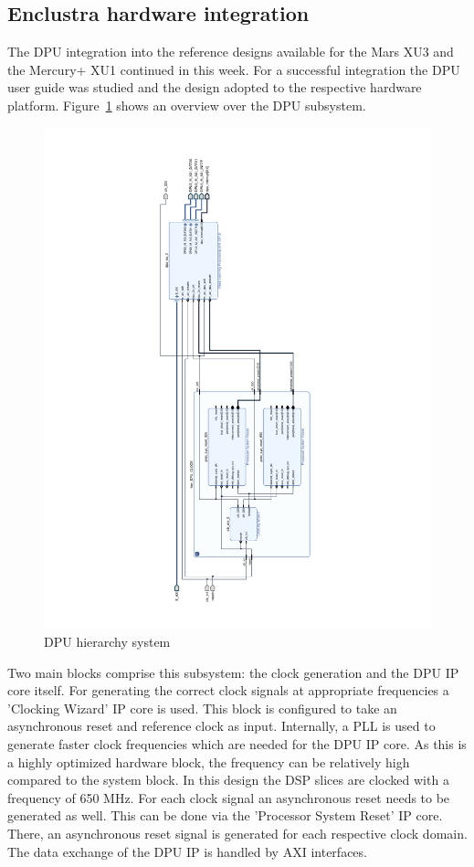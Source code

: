\subsection{Enclustra hardware integration}
The \ac{DPU} integration into the reference designs available for the Mars XU3 and the Mercury+ XU1 continued in this week. For a successful integration the \ac{DPU} user guide was studied and the design adopted to the respective hardware platform. Figure~\ref{fig:dpu_hier} shows an overview over the \ac{DPU} subsystem.
\begin{figure}[!htb]
	\centering
		\includegraphics[width=\textwidth]{bilder/dpu_hier.pdf}
		\caption{\acs{DPU} hierarchy system}
		\label{fig:dpu_hier}
\end{figure}
Two main blocks comprise this subsystem: the clock generation and the \ac{DPU} \ac{IP} core itself. For generating the correct clock signals at appropriate frequencies a 'Clocking Wizard' \ac{IP} core is used. This block is configured to take an asynchronous reset and reference clock as input. Internally, a \ac{PLL} is used to generate faster clock frequencies which are needed for the \ac{DPU} \ac{IP} core. As this is a highly optimized hardware block, the frequency can be relatively high compared to the system block. In this design the \ac{DSP} slices are clocked with a frequency of 650 MHz. For each clock signal an asynchronous reset needs to be generated as well. This can be done via the 'Processor System Reset' \ac{IP} core. There, an asynchronous reset signal is generated for each respective clock domain. The data exchange of the \ac{DPU} \ac{IP} is handled by \ac{AXI} interfaces.
